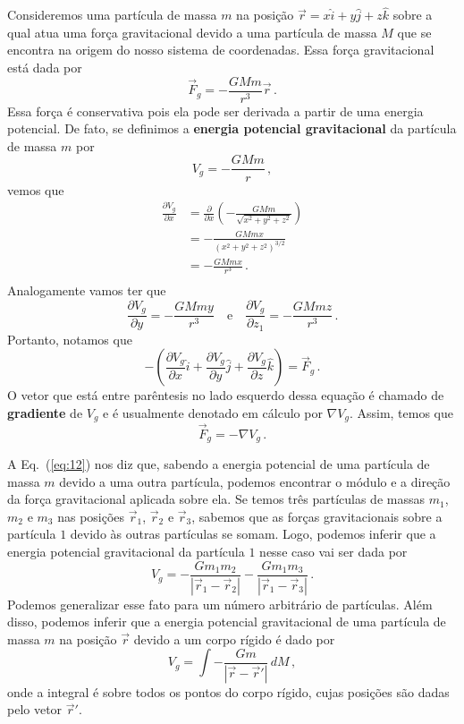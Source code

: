 \documentclass[papersize=a4,DIV=calc,twocolumn=on]{scrartcl}
\newcommand{\dpar}[1]{\left(#1\right)}
\theoremstyle{definition}
\begin{document}
Consideremos uma partícula de massa $m$ na posição
$\vec r=x\hat i+y\hat j+z\hat k$ sobre a qual atua uma força
gravitacional devido a uma partícula de massa $M$ que se encontra na
origem do nosso sistema de coordenadas. Essa força gravitacional está
dada por
$$\vec F_g=-\frac{GMm}{r^3}\vec r\,.$$
Essa força é conservativa pois ela pode ser derivada a partir de uma
energia potencial. De fato, se definimos a \textbf{energia potencial
  gravitacional} da partícula de massa $m$ por
\begin{equation}
  \label{eq:11}
  V_g=-\frac{GMm}{r}\,,
\end{equation}
vemos que
\begin{equation*}
  \begin{split}
    \frac{\partial V_g}{\partial x}&=\frac{\partial}{\partial x}\dpar{-\frac{GMm}{\sqrt{x^2+y^2+z^2}}}\\
    &=-\frac{GMmx}{(x^2+y^2+z^2)^{3/2}}\\
    &=-\frac{GMmx}{r^3}\,.\\
  \end{split}
\end{equation*}
Analogamente vamos ter que
$$\frac{\partial V_g}{\partial y}=-\frac{GMmy}{r^3}\quad\text{e}\quad\frac{\partial V_g}{\partial z_1}=-\frac{GMmz}{r^3}\,.$$
Portanto, notamos que
$$-\dpar{\frac{\partial V_g}{\partial x}\hat i+\frac{\partial V_g}{\partial y}\hat j+\frac{\partial V_g}{\partial z}\hat k}=\vec F_g\,.$$
O vetor que está entre parêntesis no lado esquerdo dessa equação é
chamado de \textbf{gradiente} de $V_g$ e é usualmente denotado em
cálculo por $\nabla V_g$. Assim, temos que
\begin{equation}
  \label{eq:12}
  \vec F_g=-\nabla V_g\,.
\end{equation}

A Eq.~(\ref{eq:12}) nos diz que, sabendo a energia potencial de uma
partícula de massa $m$ devido a uma outra partícula, podemos encontrar
o módulo e a direção da força gravitacional aplicada sobre ela. Se
temos três partículas de massas $m_1$, $m_2$ e $m_3$ nas posições
$\vec r_1$, $\vec r_2$ e $\vec r_3$, sabemos que as forças
gravitacionais sobre a partícula $1$ devido às outras partículas se
somam. Logo, podemos inferir que a energia potencial gravitacional da
partícula $1$ nesse caso vai ser dada por
$$V_g=-\frac{Gm_1m_2}{|\vec r_1-\vec r_2|}-\frac{Gm_1m_3}{|\vec r_1-\vec r_3|}\,.$$
Podemos generalizar esse fato para um número arbitrário de
partículas. Além disso, podemos inferir que a energia potencial
gravitacional de uma partícula de massa $m$ na posição $\vec r$ devido
a um corpo rígido é dado por
$$V_g=\int -\frac{Gm}{|\vec r-\vec r'|}\,dM\,,$$
onde a integral é sobre todos os pontos do corpo rígido, cujas
posições são dadas pelo vetor $\vec r'$.
\end{document}
